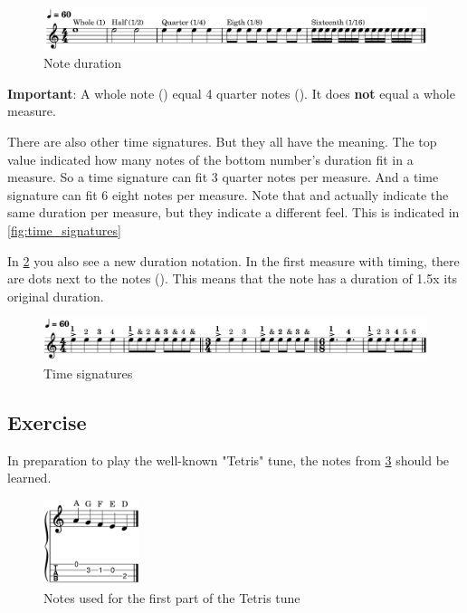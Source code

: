 \begin{figure}[h]
	\centering
	\includegraphics[width=\textwidth]{../MuseScore/MusicNotation/NoteDurations_Basic.png}
	\caption{Note duration}
	\label{fig:ukulele_note_duration_basic}
\end{figure}

\textbf{Important}: A whole note (\wholeNote) equal 4 quarter notes (\quarterNote). It does \textbf{not} equal a whole measure. \newline

There are also other time signatures. But they all have the meaning. The top value indicated how many notes of the bottom number's duration fit in a measure. So a  time signature can fit 3 quarter notes per measure. And a  time signature can fit 6 eight notes per measure. Note that  and  actually indicate the same duration per measure, but they indicate a different feel. This is indicated in \ref{fig:time_signatures}

In \ref{fig:ukulele_time_signatures} you also see a new duration notation. In the first measure with  timing, there are dots next to the notes (\quarterNoteDottedDown). This means that the note has a duration of 1.5x its original duration.

\begin{figure}[h]
	\centering
	\includegraphics[width=\textwidth]{../MuseScore/MusicNotation/TimeSignature.png}
	\caption{Time signatures}
	\label{fig:ukulele_time_signatures}
\end{figure}

\newpage

\subsection{Exercise}

In preparation to play the well-known "Tetris" tune, the notes from \ref{fig:ukulele_notes_for_tetris_first_part} should be learned.

\begin{figure}[h]
	\centering
	\includegraphics[width=0.25\textwidth]{../MuseScore/Ukulele/UkuleleNotesUsedInTetrisFirstPart.png}
	\caption{Notes used for the first part of the Tetris tune}
	\label{fig:ukulele_notes_for_tetris_first_part}
\end{figure}

